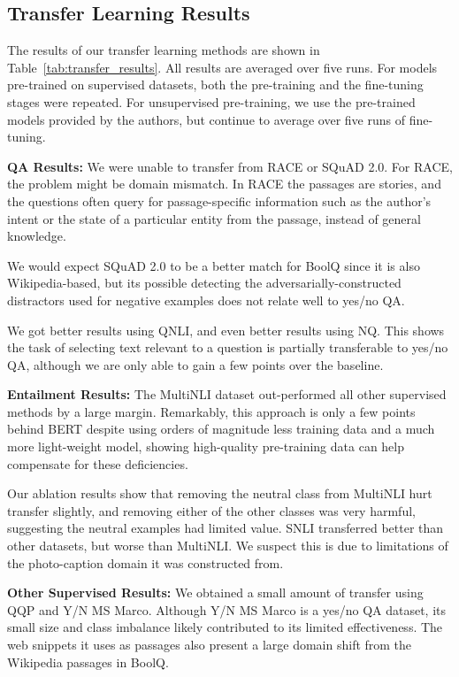 \subsection{Transfer Learning Results}

The results of our transfer learning methods are shown in Table~\ref{tab:transfer_results}. All results are averaged over five runs. For models pre-trained on supervised datasets, both the pre-training and the fine-tuning stages were repeated. For unsupervised pre-training, we use the pre-trained models provided by the authors, but continue to average over five runs of fine-tuning.

\textbf{QA Results:} We were unable to transfer from RACE or SQuAD 2.0. For RACE, the problem might be domain mismatch. In RACE the passages are stories, and the questions often query for passage-specific information such as the author's intent or the state of a particular entity from the passage, instead of general knowledge.

We would expect SQuAD 2.0 to be a better match for BoolQ since it is also Wikipedia-based, but its possible detecting the adversarially-constructed distractors used for negative examples does not relate well to yes/no QA.

We got better results using QNLI, and even better results using NQ. This shows the task of selecting text relevant to a question is partially transferable to yes/no QA, although we are only able to gain a few points over the baseline.

\textbf{Entailment Results:} The MultiNLI dataset out-performed all other supervised methods by a large margin. Remarkably, this approach is only a few points behind BERT despite using orders of magnitude less training data and a much more light-weight model, showing high-quality pre-training data can help compensate for these deficiencies.

Our ablation results show that removing the neutral class from MultiNLI hurt transfer slightly, and removing either of the other classes was very harmful, suggesting the neutral examples had limited  value. SNLI transferred better than other datasets, but worse than MultiNLI. We suspect this is due to limitations of the photo-caption domain it was constructed from.

\textbf{Other Supervised Results:} We obtained a small amount of transfer using QQP and Y/N MS Marco. Although Y/N MS Marco is a yes/no QA dataset, its small size and class imbalance likely contributed to its limited effectiveness. The web snippets it uses as passages also present a large domain shift from the Wikipedia passages in BoolQ.

